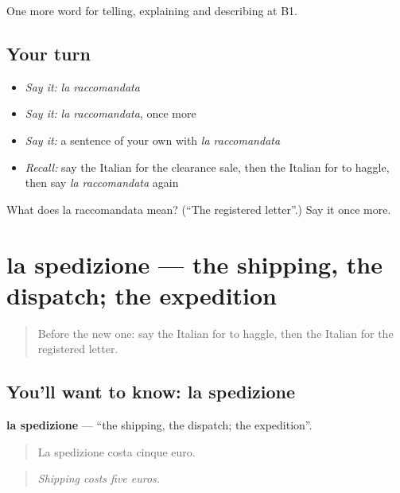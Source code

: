 \begin{grammarlens}[title={What you've built}]
One more word for telling, explaining and describing at B1.
\end{grammarlens}

\subsection*{Your turn}
\begin{itemize}
\raggedright
  \item \emph{Say it:} \emph{la raccomandata}
  \item \emph{Say it:} \emph{la raccomandata}, once more
  \item \emph{Say it:} a sentence of your own with \emph{la raccomandata}
  \item \emph{Recall:} say the Italian for the clearance sale, then the Italian for to haggle, then say \emph{la raccomandata} again
\end{itemize}

\begin{tcolorbox}[breakable,colback=teal!4,colframe=teal!35!black,title={Before you move on}]
What does la raccomandata mean? (\textquotedblleft{}The registered letter\textquotedblright{}.) Say it once more.
\end{tcolorbox}
\section[la spedizione]{la spedizione — the shipping, the dispatch; the expedition}

\label{lesson:IT-C458-spedizione}



\begin{quote}
Before the new one: say the Italian for to haggle, then the Italian for the registered letter.
\end{quote}

\subsection*{You'll want to know: la spedizione}
\textbf{la spedizione} — \textquotedblleft{}the shipping, the dispatch; the expedition\textquotedblright{}.

\begin{quote}
La spedizione costa cinque euro.
\end{quote}

\begin{quote}
\emph{Shipping costs five euros.}
\end{quote}

